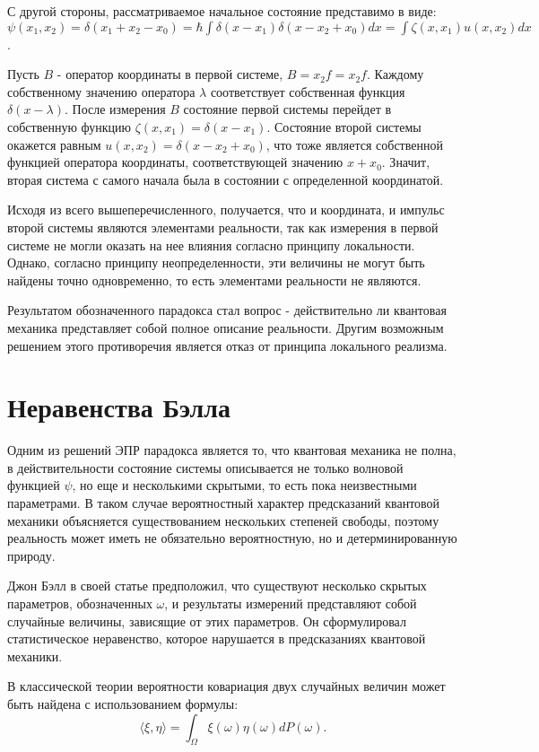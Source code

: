 \documentclass[11pt]{article}
\begin{document}
С другой стороны, рассматриваемое начальное состояние представимо в виде: $\psi(x_1, x_2) = \delta(x_1 + x_2 - x_0) = \hbar\int\delta(x - x_1)\delta (x - x_2 + x_0)dx = \int\zeta(x, x_1)u(x, x_2)dx$. 

Пусть $B$ - оператор координаты в первой системе, $B = \hat{x_2}f = x_2f$. Каждому собственному значению оператора $\lambda$ соответствует собственная функция $\delta(x - \lambda)$. После измерения $B$ состояние первой системы перейдет в собственную функцию $\zeta(x, x_1) = \delta(x - x_1)$. Состояние второй системы окажется равным $u(x, x_2) = \delta(x - x_2 + x_0)$, что тоже является собственной функцией оператора координаты, соответствующей значению $x + x_0$. Значит, вторая система с самого начала была в состоянии с определенной координатой.

Исходя из всего вышеперечисленного, получается, что и координата, и импульс второй системы являются элементами реальности, так как измерения в первой системе не могли оказать на нее влияния согласно принципу локальности. Однако, согласно принципу неопределенности, эти величины не могут быть найдены точно одновременно, то есть элементами реальности не являются.

Результатом обозначенного парадокса стал вопрос - действительно ли квантовая механика представляет собой полное описание реальности. Другим возможным решением этого противоречия является отказ от принципа локального реализма.

\section{Неравенства Бэлла}
Одним из решений ЭПР парадокса является то, что квантовая механика не полна, в действительности состояние системы описывается не только волновой функцией  $\psi$, но еще и несколькими скрытыми, то есть пока неизвестными параметрами. В таком случае вероятностный характер предсказаний квантовой механики объясняется существованием нескольких степеней свободы, поэтому реальность может иметь не обязательно вероятностную, но и детерминированную природу.

Джон Бэлл в своей статье \cite{Bell} предположил, что существуют несколько скрытых параметров, обозначенных $\omega$, и результаты измерений представляют собой случайные величины, зависящие от этих параметров. Он сформулировал статистическое неравенство, которое нарушается в предсказаниях квантовой механики. 

В классической теории вероятности ковариация двух случайных величин может быть найдена с использованием формулы:
\[
\langle \xi, \eta \rangle = \int_\Omega \xi(\omega)\eta(\omega)dP(\omega).
\]
\end{document}
